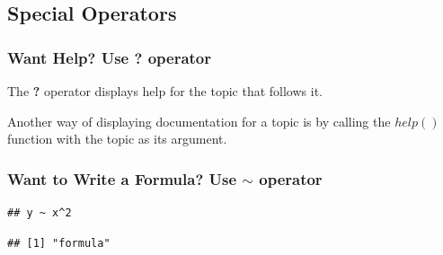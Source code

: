 \subsection{Special Operators}
\subsubsection{Want Help? Use \textbf{?} operator}
\noindent The \textbf{?} operator displays help for the topic that follows it.
\begin{knitrout}
\color{fgcolor}\begin{kframe}
\begin{alltt}
\end{alltt}
\end{kframe}
\end{knitrout}

\noindent Another way of displaying documentation for a topic is by calling the $help()$ function with the topic as its argument. 
\begin{knitrout}
\color{fgcolor}\begin{kframe}
\begin{alltt}
\hlstd{(}\hlstd{)}
\end{alltt}
\end{kframe}
\end{knitrout}

\subsubsection{Want to Write a Formula? Use $\sim$ operator}
\begin{HIGHLIGHT}
\par{}
\end{HIGHLIGHT}
\begin{knitrout}
\color{fgcolor}\begin{kframe}
\begin{alltt}
 \hlopt{~} \hlopt{^}
\end{alltt}
\begin{verbatim}
## y ~ x^2
\end{verbatim}
\begin{alltt}
 \hlopt{~} \hlopt{^}\hlstd{)}
\end{alltt}
\begin{verbatim}
## [1] "formula"
\end{verbatim}
\end{kframe}
\end{knitrout}
